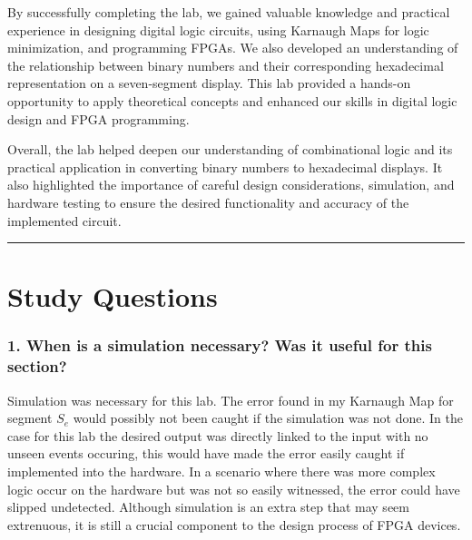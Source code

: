 \documentclass{article}
\begin{document}
By successfully completing the lab, we gained valuable knowledge and practical experience in designing digital logic circuits, using Karnaugh Maps for logic minimization, and programming FPGAs. We also developed an understanding of the relationship between binary numbers and their corresponding hexadecimal representation on a seven-segment display. This lab provided a hands-on opportunity to apply theoretical concepts and enhanced our skills in digital logic design and FPGA programming.

Overall, the lab helped deepen our understanding of combinational logic and its practical application in converting binary numbers to hexadecimal displays. It also highlighted the importance of careful design considerations, simulation, and hardware testing to ensure the desired functionality and accuracy of the implemented circuit.
\vspace{5mm}
\hrule

\section*{\textcolor{mycolor}{Study Questions}}
\subsubsection*{\textcolor{mycolor}{1. When is a simulation necessary? Was it useful for this section?}}
Simulation was necessary for this lab. The error found in my Karnaugh Map for segment $S_e$ would possibly not been caught if the simulation was not done. In the case for this lab the desired output was directly linked to the input with no unseen events occuring, this would have made the error easily caught if implemented into the hardware. In a scenario where there was more complex logic occur on the hardware but was not so easily witnessed, the error could have slipped undetected. Although simulation is an extra step that may seem extrenuous, it is still a crucial component to the design process of FPGA devices.

\newpage
\end{document}
